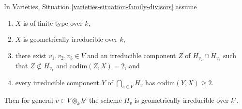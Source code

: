 \begin{lemma}
\label{lemma-bertini-irreducible}
\begin{reference}
\cite[Theorem 6.3 part 4)]{Jou}
\end{reference}
In Varieties, Situation \ref{varieties-situation-family-divisors} assume
\begin{enumerate}
\item $X$ is of finite type over $k$,
\item $X$ is geometrically irreducible over $k$,
\item there exist $v_1, v_2, v_3 \in V$ and an irreducible component
$Z$ of $H_{v_2} \cap H_{v_3}$ such that $Z \not \subset H_{v_1}$ and
$\text{codim}(Z, X) = 2$, and
\item every irreducible component $Y$ of $\bigcap_{v \in V} H_v$
has $\text{codim}(Y, X) \geq 2$.
\end{enumerate}
Then for general $v \in V \otimes_k k'$
the scheme $H_v$ is geometrically irreducible over $k'$.
\end{lemma}

